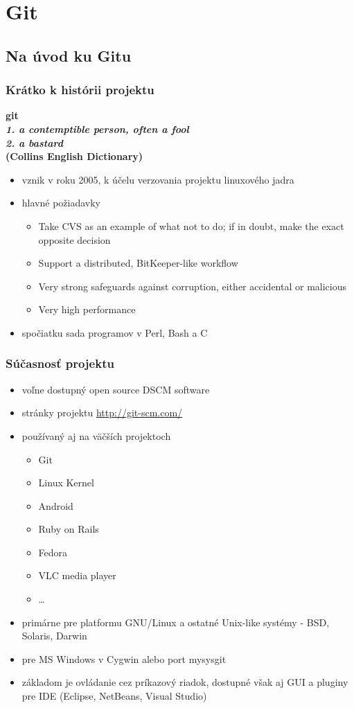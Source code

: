 \documentclass[red]{beamer}
\begin{document}
\section{Git} %

\subsection{Na úvod ku Gitu}
\begin{frame}
\frametitle{Krátko k histórii projektu}

\textbf{ git \\
 \textit{1.	a contemptible person, often a fool\\
2.	a bastard}} \\ 
\textbf{ \tiny{ (Collins English Dictionary)}}
\begin{itemize}
\item vznik v roku 2005, k účelu verzovania projektu linuxového jadra
\item hlavné požiadavky 
\begin{itemize}
\item Take CVS as an example of what not to do; if in doubt, make the exact opposite decision
\item Support a distributed, BitKeeper-like workflow
\item Very strong safeguards against corruption, either accidental or malicious
\item Very high performance
 \end{itemize}
\item spočiatku sada programov v Perl, Bash a C
 \end{itemize}
\end{frame}

\begin{frame}
  \frametitle{Súčasnosť projektu}   

\begin{itemize}
\item voľne dostupný open source DSCM software
\item stránky projektu \href{http://git-scm.com/}{http://git-scm.com/}
\item používaný aj na väčších projektoch
\begin{itemize}
\item Git
\item Linux Kernel
\item Android
\item Ruby on Rails
\item Fedora
\item VLC media player
\item \dots
 \end{itemize}
\item primárne pre platformu GNU/Linux a ostatné Unix-like systémy - BSD, Solaris, Darwin
\item pre MS Windows v Cygwin alebo port mysysgit
\item základom je ovládanie cez príkazový riadok, dostupné však aj GUI a pluginy pre IDE (Eclipse, NetBeans, Visual Studio)
 \end{itemize}
\end{frame}
\end{document}
